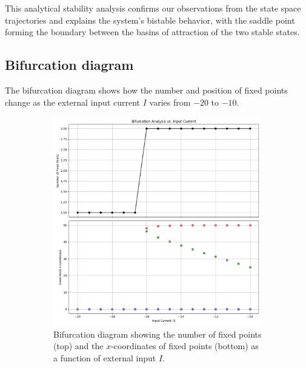 \documentclass{article}
\begin{document}
This analytical stability analysis confirms our observations from the state space trajectories and explains the system's bistable behavior, with the saddle point forming the boundary between the basins of attraction of the two stable states.

\subsection{Bifurcation diagram}

The bifurcation diagram shows how the number and position of fixed points change as the external input current $I$ varies from $-20$ to $-10$.

\begin{figure}[H]
    \centering
    \begin{subfigure}{0.48\textwidth}
        \includegraphics[width=\textwidth]{bifurcation_analysis_22.png}
        \caption{Bifurcation diagram showing the number of fixed points (top) and the $x$-coordinates of fixed points (bottom) as a function of external input $I$.}
        \label{fig:bifurcation_matrix}
    \end{subfigure}
    \hfill
    \begin{subfigure}{0.48\textwidth}

\end{subfigure}
\end{figure}
\end{document}
